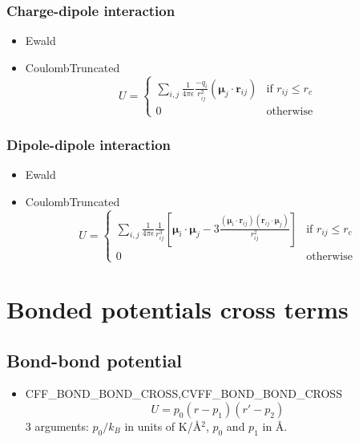 \subsubsection{Charge-dipole interaction}

\begin{itemize}
\item{Ewald}\\
\item{CoulombTruncated}
\begin{equation}
 U=\begin{cases}
    \sum_{i,j} \frac{1}{4\pi\epsilon} \frac{-q_i}{r^2_{ij}}
      \left({\boldsymbol \mu}_j\cdot\mathbf{r}_{ij}\right)& \text{if }r_{ij}\leq r_c\\
    0 & \text{otherwise}
   \end{cases}
\end{equation}
\end{itemize}


\subsubsection{Dipole-dipole interaction}

\begin{itemize}
\item{Ewald}\\
\item{CoulombTruncated}
\begin{equation}
 U=\begin{cases}
    \sum_{i,j} \frac{1}{4\pi\epsilon}\frac{1}{r^3_{ij}}
    \left[{\boldsymbol \mu}_i\cdot {\boldsymbol \mu}_j-3\frac{\left({\boldsymbol\mu}_i\cdot\mathbf{r}_{ij}\right)
    \left(\mathbf{r}_{ij}\cdot{\boldsymbol \mu}_j\right)}{r^2_{ij}}\right]& \text{if }r_{ij}\leq r_c\\
    0 & \text{otherwise}
   \end{cases}
\end{equation}
\end{itemize}


\section{Bonded potentials cross terms}

\subsection{Bond-bond potential}

\begin{itemize}
  \item{CFF\_BOND\_BOND\_CROSS,CVFF\_BOND\_BOND\_CROSS}\\
  \begin{equation}
  U=p_0\left(r-p_1\right)\left(r'-p_2\right)
  \end{equation}
  3 arguments: $p_0/k_B$ in units of K/\AA$^2$, $p_0$ and $p_1$ in \AA.
\end{itemize}


